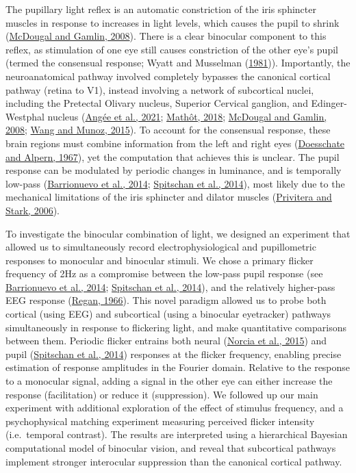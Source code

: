 \documentclass[
]{article}
\begin{document}
The pupillary light reflex is an automatic constriction of the iris sphincter muscles in response to increases in light levels, which causes the pupil to shrink (\protect\hyperlink{ref-McDougal2008}{McDougal and Gamlin, 2008}). There is a clear binocular component to this reflex, as stimulation of one eye still causes constriction of the other eye's pupil (termed the consensual response; Wyatt and Musselman (\protect\hyperlink{ref-Wyatt1981}{1981})). Importantly, the neuroanatomical pathway involved completely bypasses the canonical cortical pathway (retina to V1), instead involving a network of subcortical nuclei, including the Pretectal Olivary nucleus, Superior Cervical ganglion, and Edinger-Westphal nucleus (\protect\hyperlink{ref-Angee2021}{Angée et al., 2021}; \protect\hyperlink{ref-Mathot2018}{Mathôt, 2018}; \protect\hyperlink{ref-McDougal2008}{McDougal and Gamlin, 2008}; \protect\hyperlink{ref-Wang2015}{Wang and Munoz, 2015}). To account for the consensual response, these brain regions must combine information from the left and right eyes (\protect\hyperlink{ref-Doesschate1967}{Doesschate and Alpern, 1967}), yet the computation that achieves this is unclear. The pupil response can be modulated by periodic changes in luminance, and is temporally low-pass (\protect\hyperlink{ref-Barrionuevo2014}{Barrionuevo et al., 2014}; \protect\hyperlink{ref-Spitschan2014}{Spitschan et al., 2014}), most likely due to the mechanical limitations of the iris sphincter and dilator muscles (\protect\hyperlink{ref-Privitera2006}{Privitera and Stark, 2006}).

To investigate the binocular combination of light, we designed an experiment that allowed us to simultaneously record electrophysiological and pupillometric responses to monocular and binocular stimuli. We chose a primary flicker frequency of 2Hz as a compromise between the low-pass pupil response (see \protect\hyperlink{ref-Barrionuevo2014}{Barrionuevo et al., 2014}; \protect\hyperlink{ref-Spitschan2014}{Spitschan et al., 2014}), and the relatively higher-pass EEG response (\protect\hyperlink{ref-Regan1966}{Regan, 1966}). This novel paradigm allowed us to probe both cortical (using EEG) and subcortical (using a binocular eyetracker) pathways simultaneously in response to flickering light, and make quantitative comparisons between them. Periodic flicker entrains both neural (\protect\hyperlink{ref-Norcia2015}{Norcia et al., 2015}) and pupil (\protect\hyperlink{ref-Spitschan2014}{Spitschan et al., 2014}) responses at the flicker frequency, enabling precise estimation of response amplitudes in the Fourier domain. Relative to the response to a monocular signal, adding a signal in the other eye can either increase the response (facilitation) or reduce it (suppression). We followed up our main experiment with additional exploration of the effect of stimulus frequency, and a psychophysical matching experiment measuring perceived flicker intensity (i.e.~temporal contrast). The results are interpreted using a hierarchical Bayesian computational model of binocular vision, and reveal that subcortical pathways implement stronger interocular suppression than the canonical cortical pathway.
\end{document}

